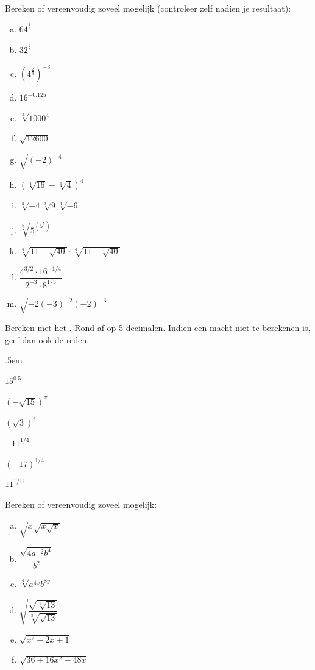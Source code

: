 \documentclass[12pt,twoside]{article}
\begin{document}
\begin{oefening}
Bereken of vereenvoudig zoveel mogelijk (controleer zelf nadien je resultaat):
\begin{multicols}{3}
\begin{enumerate}[(a)]
  \itemsep.5em
  \item $64^{\frac{1}{3}}$
  \item $32^{\frac{2}{5}}$
  \item $\left(4^{\frac{2}{3}}\right)^{-3}$
  \item $16^{-0.125}$
  \item $\sqrt[3]{1000^4}$
  \item $\sqrt{12600}$
  \item $\sqrt{\left(-2\right)^{-4}}$
  \item $\left(\sqrt[4]{16}-\sqrt[4]{4}\right)^4$
  \item $\sqrt[3]{-4}\sqrt[3]{9}\sqrt[3]{-6}$
  \item $\sqrt[5]{5^{(5^5)}}$
  \item $\sqrt[4]{11-\sqrt{40}}\cdot\sqrt[4]{11+\sqrt{40}}$
  \item $\dfrac{4^{3/2}\cdot 16^{-1/4}}{2^{-3}\cdot 8^{1/3}}$
  \item $\sqrt{-2(-3)^{-2}(-2)^{-3}}$
\end{enumerate}
\end{multicols}
\end{oefening}

\begin{oefening}
Bereken met het . Rond af op 5 decimalen. Indien een macht niet te berekenen is, geef dan ook de reden.
\begin{exlist}{3}
  \itemsep.5em
  \item $15^{0.5}$
  \item $\left(-\sqrt{15}\right)^{\pi}$
  \item $\left(\sqrt{3}\right)^e$
  \item $-11^{1/4}$
  \item $(-17)^{1/4}$
  \item $11^{1/11}$
\end{exlist}
\end{oefening}

\begin{oefening}
Bereken of vereenvoudig zoveel mogelijk:
\begin{multicols}{3}
\begin{enumerate}[(a)]
  \itemsep.5em
  \item $\sqrt{x\sqrt{x\sqrt{x}}}$
  \item $\dfrac{\sqrt{4a^{-2}b^4}}{b^2}$
  \item $\sqrt[4]{a^{4x}b^{8y}}$
  \item $\sqrt{\dfrac{\sqrt{\sqrt[3]{13}}}{\sqrt[3]{\sqrt{13}}}}$
  \item $\sqrt{x^2+2x+1}$
  \item $\sqrt{36+16x^2-48x}$
\end{enumerate}
\end{multicols}
\end{oefening}
\end{document}
